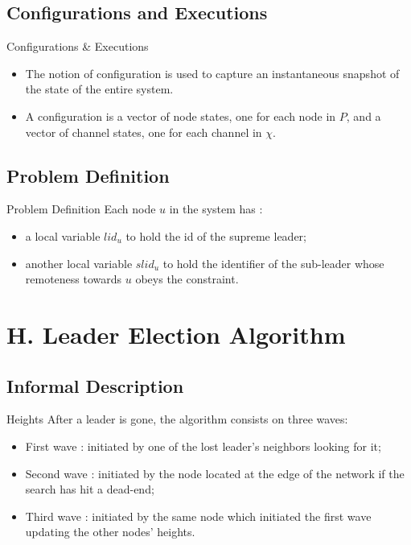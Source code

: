 \documentclass{beamer}
\begin{document}
\subsection{Configurations and Executions}
\begin{frame}{Configurations \& Executions}

\begin{itemize}
	\item The notion of configuration is used to capture an instantaneous snapshot of the state of the entire system.
	\item A configuration is a vector of node states, one for each node in $P$, and a vector of channel states, one for each channel in $\chi$.
\end{itemize}

\end{frame}


\subsection{Problem Definition}

\begin{frame}{Problem Definition}
Each node $u$ in the system has :
\begin{itemize}
	\item a local variable $lid_{u}$ to hold the id of the supreme leader;
	\item  another local variable $slid_u$ to hold the identifier of the sub-leader whose remoteness towards $u$ obeys the constraint.
\end{itemize}

\end{frame}

\section{H. Leader Election Algorithm}
\subsection{Informal Description}
\begin{frame}{Heights}
After a leader is gone, the algorithm consists on three waves:
\begin{itemize}
	\item First wave : initiated by one of the lost leader's neighbors looking for it;  
	\item Second wave : initiated by the node located at the edge of the network if the search has hit a dead-end;
	\item Third wave : initiated by the same node which initiated the first wave updating the other nodes' heights.
\end{itemize}

\end{frame}
\end{document}
